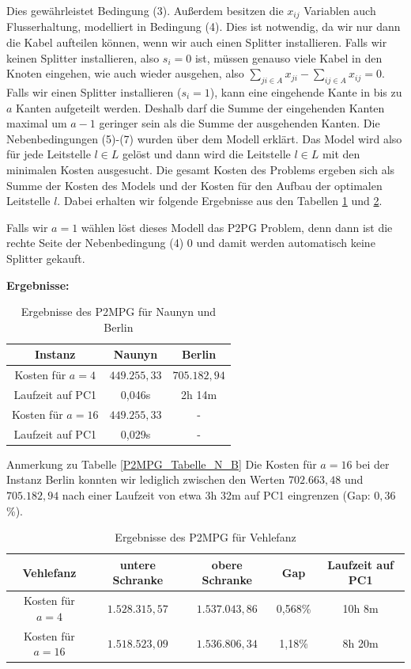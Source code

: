 \documentclass[11pt,a4paper]{article}
\theoremstyle{my_th_style1}
\begin{document}
Dies gewährleistet Bedingung (3).
Außerdem besitzen die $x_{ij}$ Variablen auch Flusserhaltung, modelliert in Bedingung (4).
Dies ist notwendig, da wir nur dann die Kabel aufteilen können, wenn wir auch einen Splitter installieren.
Falls wir keinen Splitter installieren, also $s_i=0$ ist, müssen genauso viele Kabel in den Knoten eingehen, wie auch wieder ausgehen, also $\displaystyle\sum_{ji \in A} x_{ji} - \displaystyle\sum_{ij \in A} x_{ij}=0$.
Falls wir einen Splitter installieren ($s_i=1$), kann eine eingehende Kante in bis zu $a$ Kanten aufgeteilt werden.
Deshalb darf die Summe der eingehenden Kanten maximal um \(a-1\) geringer sein als die Summe der ausgehenden Kanten.
Die Nebenbedingungen (5)-(7) wurden über dem Modell erklärt.
Das Model wird also für jede Leitstelle $l \in L$ gelöst und dann wird die Leitstelle $l \in L$ mit den minimalen Kosten ausgesucht. Die gesamt Kosten des Problems ergeben sich als Summe der Kosten des Models und der Kosten für den Aufbau der optimalen Leitstelle $l$. Dabei erhalten wir folgende Ergebnisse aus den Tabellen \ref{P2MPG_Tabelle_N_B} und \ref{P2MPG_Tabelle_V}.
  
Falls wir $a=1$ w\"ahlen l\"ost dieses Modell das P2PG Problem, denn dann ist die rechte Seite der Nebenbedingung (4) 0 und damit werden automatisch keine Splitter gekauft.
 
\textbf{Ergebnisse:}
 \begin{table}[h]
 	\centering
 	\begin{tabular}{c|c|c}
 		Instanz & Naunyn & Berlin \\	
 		\hline
 		 Kosten für $a=4$ & \(449.255,33\) & \(705.182,94\) \\
 		 Laufzeit auf PC1 & 0,046s & 2h 14m \\
 		 \hline
 		Kosten für $a=16$ & \(449.255,33\) & - \\
 		Laufzeit auf PC1 & 0,029s & - \\
 	\end{tabular}
 	\caption{Ergebnisse des P2MPG f\"ur Naunyn und Berlin}
 	\label{P2MPG_Tabelle_N_B}
 \end{table}
 
 Anmerkung zu Tabelle \eqref{P2MPG_Tabelle_N_B} Die Kosten f\"ur \(a=16\) bei der Instanz Berlin konnten wir lediglich zwischen den Werten \(702.663,48\) und \(705.182,94\) nach einer Laufzeit von etwa 3h 32m auf PC1 eingrenzen (Gap: \(0,36\) \%).
 
 \begin{table}[h]
 	\centering
 	\begin{tabular}{c|c|c|c|c}
 		Vehlefanz & untere Schranke & obere Schranke & Gap & Laufzeit auf PC1\\	
 		\hline
 		 Kosten für $a=4$ & \(1.528.315,57\) & \(1.537.043,86\) & 0,568\% & 10h 8m\\
 		 \hline
 		Kosten für $a=16$ & \(1.518.523,09\) & \(1.536.806,34\) & 1,18\% & 8h 20m \\
 	\end{tabular}
 	\caption{Ergebnisse des P2MPG f\"ur Vehlefanz}
 	\label{P2MPG_Tabelle_V}
 \end{table}
 
\end{document}
